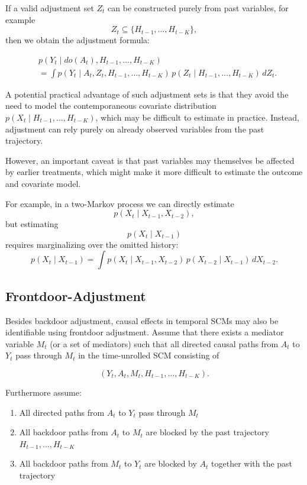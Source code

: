 \documentclass[11pt]{article}
\theoremstyle{definition}
\theoremstyle{remark}
\begin{document}
If a valid adjustment set $Z_t$ can be constructed purely from past variables, for example
\[
Z_t \subseteq \{H_{t-1}, \dots, H_{t-K}\},
\]
then we obtain the adjustment formula:

\begin{equation}
\begin{aligned}
&p(Y_t \mid do(A_t), H_{t-1},\dots,H_{t-K}) \\
&=
\int
p(Y_t \mid A_t, Z_t, H_{t-1},\dots,H_{t-K})
\, p(Z_t \mid H_{t-1},\dots,H_{t-K})
\, dZ_t.
\end{aligned}
\end{equation}

A potential practical advantage of such adjustment sets is that they avoid the need to model the contemporaneous covariate distribution $p(X_t \mid H_{t-1},\dots,H_{t-K})$, which may be difficult to estimate in practice. Instead, adjustment can rely purely on already observed variables from the past trajectory.

However, an important caveat is that past variables may themselves be affected by earlier treatments, which might make it more difficult to estimate the outcome and covariate model. 

For example, in a two-Markov process we can directly estimate
\[
p(X_t \mid X_{t-1}, X_{t-2}),
\]
but estimating
\[
p(X_t \mid X_{t-1})
\]
requires marginalizing over the omitted history:
\[
p(X_t \mid X_{t-1})
=
\int
p(X_t \mid X_{t-1}, X_{t-2}) \, p(X_{t-2} \mid X_{t-1})
\, dX_{t-2}.
\]

\subsection{Frontdoor-Adjustment}

Besides backdoor adjustment, causal effects in temporal SCMs may also be identifiable using frontdoor adjustment. Assume that there exists a mediator variable $M_t$ (or a set of mediators) such that all directed causal paths from $A_t$ to $Y_t$ pass through $M_t$ in the time-unrolled SCM consisting of

\[
(Y_t, A_t, M_t, H_{t-1}, \dots, H_{t-K}).
\]

Furthermore assume:

\begin{enumerate}

\item All directed paths from $A_t$ to $Y_t$ pass through $M_t$

\item All backdoor paths from $A_t$ to $M_t$ are blocked by the past trajectory $H_{t-1},\dots,H_{t-K}$

\item All backdoor paths from $M_t$ to $Y_t$ are blocked by $A_t$ together with the past trajectory

\end{enumerate}
\end{document}
